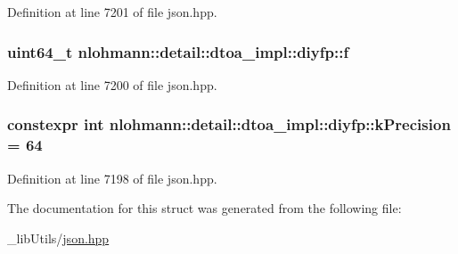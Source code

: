 Definition at line 7201 of file json.\+hpp.

\subsubsection[{\texorpdfstring{f}{f}}]{\setlength{\rightskip}{0pt plus 5cm}uint64\+\_\+t nlohmann\+::detail\+::dtoa\+\_\+impl\+::diyfp\+::f}\hypertarget{structnlohmann_1_1detail_1_1dtoa__impl_1_1diyfp_a90f04c892ac1e707fdb50b0e1eb59030}{}\label{structnlohmann_1_1detail_1_1dtoa__impl_1_1diyfp_a90f04c892ac1e707fdb50b0e1eb59030}


Definition at line 7200 of file json.\+hpp.

\subsubsection[{\texorpdfstring{k\+Precision}{kPrecision}}]{\setlength{\rightskip}{0pt plus 5cm}constexpr int nlohmann\+::detail\+::dtoa\+\_\+impl\+::diyfp\+::k\+Precision = 64\hspace{0.3cm}{\ttfamily [static]}}\hypertarget{structnlohmann_1_1detail_1_1dtoa__impl_1_1diyfp_a03682754b06ed4f30b263119eecc2d52}{}\label{structnlohmann_1_1detail_1_1dtoa__impl_1_1diyfp_a03682754b06ed4f30b263119eecc2d52}


Definition at line 7198 of file json.\+hpp.



The documentation for this struct was generated from the following file\+:\begin{DoxyCompactItemize}
\item 
\+\_\+lib\+Utils/\hyperlink{json_8hpp}{json.\+hpp}\end{DoxyCompactItemize}
